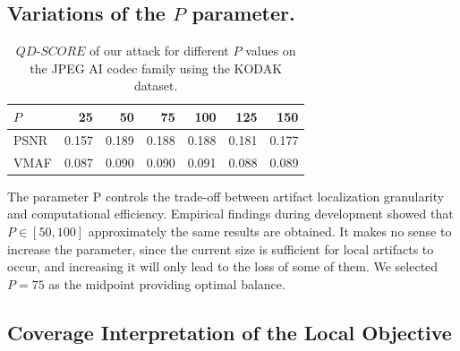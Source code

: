 \subsection{Variations of the $P$ parameter.}


\begin{table}[!t]
\centering
\setlength{\tabcolsep}{3.5pt}
\renewcommand{\arraystretch}{0.88}
\begin{tabular}{l|rrrrrr}
\toprule
$P$ & 25 & 50 & 75 & 100 & 125 & 150 \\
\midrule
PSNR & 0.157 & 0.189 & 0.188 & 0.188 & 0.181 & 0.177 \\
VMAF & 0.087 & 0.090 & 0.090 & 0.091 & 0.088 & 0.089 \\
\bottomrule
\end{tabular}
\caption{$QD\text{-}SCORE$ of our attack for different $P$ values on the JPEG AI codec family using the KODAK dataset.}
\label{table:RES_P}
\end{table}

The parameter P controls the trade-off between artifact localization granularity and computational efficiency. Empirical findings during development showed that $P \in \left[50, 100 \right]$ approximately the same results are obtained. It makes no sense to increase the parameter, since the current size is sufficient for local artifacts to occur, and increasing it will only lead to the loss of some of them. We selected $P = 75$ as the midpoint providing optimal balance.


\subsection{Coverage Interpretation of the Local Objective}

